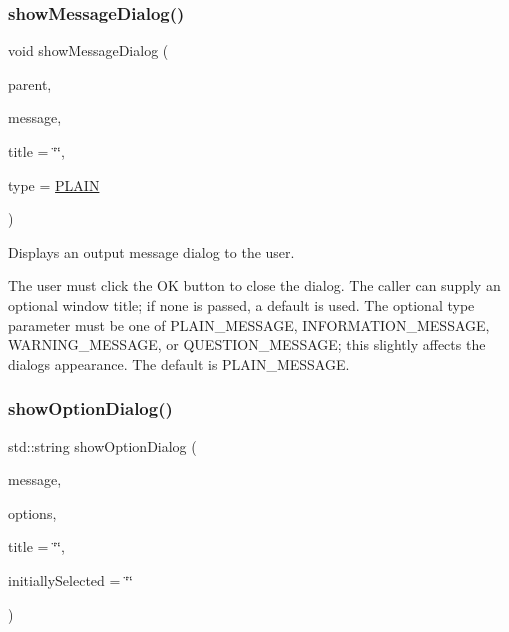 \subsubsection{\texorpdfstring{show\+Message\+Dialog()}{showMessageDialog()}\hspace{0.1cm}{\footnotesize\ttfamily [3/3]}}
{\footnotesize\ttfamily void show\+Message\+Dialog (\begin{DoxyParamCaption}\item[{Q\+Widget $\ast$}]{parent,  }\item[{const std\+::string \&}]{message,  }\item[{const std\+::string \&}]{title = {\ttfamily \char`\"{}\char`\"{}},  }\item[{\mbox{\hyperlink{classGOptionPane_ac6606ebe91c8ac66a2c314c79f5ab013}{Message\+Type}}}]{type = {\ttfamily \mbox{\hyperlink{classGOptionPane_ac6606ebe91c8ac66a2c314c79f5ab013a8386f3e3e7be0b7b603636867c133a5d}{P\+L\+A\+IN}}} }\end{DoxyParamCaption})\hspace{0.3cm}{\ttfamily [static]}}



Displays an output message dialog to the user. 

The user must click the \textquotesingle{}OK\textquotesingle{} button to close the dialog. The caller can supply an optional window title; if none is passed, a default is used. The optional \textquotesingle{}type\textquotesingle{} parameter must be one of P\+L\+A\+I\+N\+\_\+\+M\+E\+S\+S\+A\+GE, I\+N\+F\+O\+R\+M\+A\+T\+I\+O\+N\+\_\+\+M\+E\+S\+S\+A\+GE, W\+A\+R\+N\+I\+N\+G\+\_\+\+M\+E\+S\+S\+A\+GE, or Q\+U\+E\+S\+T\+I\+O\+N\+\_\+\+M\+E\+S\+S\+A\+GE; this slightly affects the dialog\textquotesingle{}s appearance. The default is P\+L\+A\+I\+N\+\_\+\+M\+E\+S\+S\+A\+GE. \mbox{\label{classGOptionPane_ab97ebcd9d5b5827fbb9292b7c045c72f}} 
\subsubsection{\texorpdfstring{show\+Option\+Dialog()}{showOptionDialog()}\hspace{0.1cm}{\footnotesize\ttfamily [1/3]}}
{\footnotesize\ttfamily std\+::string show\+Option\+Dialog (\begin{DoxyParamCaption}\item[{const std\+::string \&}]{message,  }\item[{const \mbox{\hyperlink{classVector}{Vector}}$<$ std\+::string $>$ \&}]{options,  }\item[{const std\+::string \&}]{title = {\ttfamily \char`\"{}\char`\"{}},  }\item[{const std\+::string \&}]{initially\+Selected = {\ttfamily \char`\"{}\char`\"{}} }\end{DoxyParamCaption})\hspace{0.3cm}{\ttfamily [static]}}



